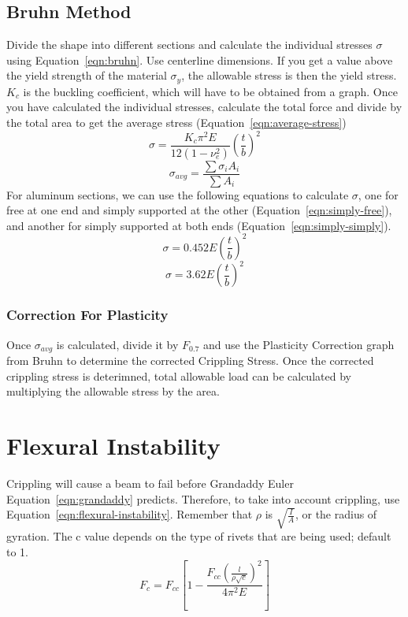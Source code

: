 \documentclass{article}
\begin{document}
\subsection{Bruhn Method}
Divide the shape into different sections and calculate the individual stresses $\sigma$ using Equation~\ref{eqn:bruhn}.
Use centerline dimensions.
If you get a value above the yield strength of the material $\sigma_y$, the allowable stress is then the yield stress.
$K_c$ is the buckling coefficient, which will have to be obtained from a graph.
Once you have calculated the individual stresses, calculate the total force and divide by the total area to get the average stress (Equation~\ref{eqn:average-stress})
\begin{equation}\label{eqn:bruhn}
    \sigma = \frac{K_c \pi ^ 2 E}{12(1 - \nu_e ^ 2)}\left(\frac{t}{b}\right) ^ 2
\end{equation}
\begin{equation}\label{eqn:average-stress}
    \sigma_{avg} = \frac{\sum\sigma_i A_i}{\sum A_i}
\end{equation}
For aluminum sections, we can use the following equations to calculate $\sigma$, one for free at one end and simply supported at the other (Equation~\ref{eqn:simply-free}), and another for simply supported at both ends (Equation~\ref{eqn:simply-simply}).
\begin{equation}\label{eqn:simply-free}
   \sigma = 0.452E\left(\frac{t}{b}\right) ^ 2
\end{equation}
\begin{equation}\label{eqn:simply-simply}
    \sigma = 3.62E\left(\frac{t}{b}\right) ^ 2
\end{equation}
\subsubsection{Correction For Plasticity}
Once $\sigma_{avg}$ is calculated, divide it by $F_{0.7}$ and use the Plasticity Correction graph from Bruhn to determine the corrected Crippling Stress.
Once the corrected crippling stress is deterimned, total allowable load can be calculated by multiplying the allowable stress by the area.
\section{Flexural Instability}
Crippling will cause a beam to fail before Grandaddy Euler Equation~\ref{eqn:grandaddy} predicts.
Therefore, to take into account crippling, use Equation~\ref{eqn:flexural-instability}.
Remember that $\rho$ is $\sqrt{\frac{I}{A}}$, or the radius of gyration.
The c value depends on the type of rivets that are being used; default to 1.
\begin{equation}\label{eqn:flexural-instability}
    F_c = F_{cc}\left[1 - \frac{F_{cc} \left(\frac{l}{\rho \sqrt{c}}\right) ^ 2}{4\pi ^2 E}\right]
\end{equation}
\end{document}

